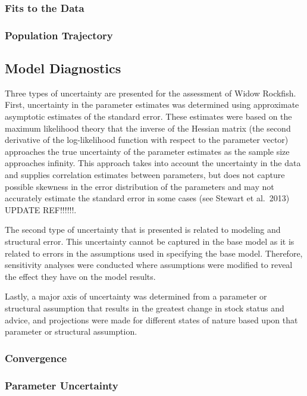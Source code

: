 \documentclass[
]{scrartcl}
\begin{document}
\subsubsection{Fits to the Data}\label{fits-to-the-data}

\subsubsection{Population Trajectory}\label{population-trajectory}

\subsection{Model Diagnostics}\label{model-diagnostics}

Three types of uncertainty are presented for the assessment of Widow
Rockfish. First, uncertainty in the parameter estimates was determined
using approximate asymptotic estimates of the standard error. These
estimates were based on the maximum likelihood theory that the inverse
of the Hessian matrix (the second derivative of the log-likelihood
function with respect to the parameter vector) approaches the true
uncertainty of the parameter estimates as the sample size approaches
infinity. This approach takes into account the uncertainty in the data
and supplies correlation estimates between parameters, but does not
capture possible skewness in the error distribution of the parameters
and may not accurately estimate the standard error in some cases (see
Stewart et al.~2013) UPDATE REF!!!!!!.

The second type of uncertainty that is presented is related to modeling
and structural error. This uncertainty cannot be captured in the base
model as it is related to errors in the assumptions used in specifying
the base model. Therefore, sensitivity analyses were conducted where
assumptions were modified to reveal the effect they have on the model
results.

Lastly, a major axis of uncertainty was determined from a parameter or
structural assumption that results in the greatest change in stock
status and advice, and projections were made for different states of
nature based upon that parameter or structural assumption.

\subsubsection{Convergence}\label{convergence}

\subsubsection{Parameter Uncertainty}\label{parameter-uncertainty}
\end{document}
